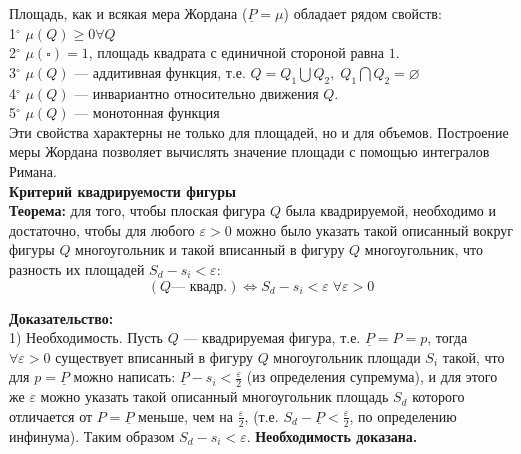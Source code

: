 \documentclass{article}
\begin{document}
  Площадь, как и всякая мера Жордана ($\underline P=\mu$) обладает рядом свойств:\\
  
  1$^\circ$ $\mu(Q)\geq 0 \forall Q$\\
  
  2$^\circ$ $\mu(\square)=1$, площадь квадрата с единичной стороной равна $1$.\\
  
  3$^\circ$ $\mu(Q)$ --- аддитивная функция, т.е. $Q=Q_1\bigcup Q_2,\; Q_1\bigcap Q_2 = \varnothing$\\
  
  4$^\circ$ $\mu(Q)$ --- инвариантно относительно движения $Q$.\\
  
  5$^\circ$ $\mu(Q)$ --- монотонная функция\\

  Эти свойства характерны не только для площадей, но и для объемов. Построение меры Жордана позволяет вычислять значение площади с помощью интегралов Римана.\\
  
  \large\textbf{Критерий квадрируемости фигуры}\normalsize\\
  
  \textbf{Теорема:} для того, чтобы плоская фигура $Q$ была квадрируемой, необходимо и достаточно, чтобы для любого $\varepsilon>0$ можно было указать такой описанный вокруг фигуры $Q$ многоугольник и такой вписанный в фигуру $Q$ многоугольник, что разность их площадей $S_d-s_i<\varepsilon$:
  \begin{equation}
    (Q \text{--- квадр.}) \Leftrightarrow S_d-s_i<\varepsilon\; \forall\varepsilon>0
  \end{equation}
  
  \textbf{Доказательство:}\\
  
  1) Необходимость. Пусть $Q$ --- квадрируемая фигура, т.е. $\underline P=P=p$, тогда $\forall\varepsilon>0$ существует вписанный в фигуру $Q$ многоугольник площади $S_i$ такой, что для $p=\underline P$ можно написать: $\underline P-s_i<\frac{\varepsilon}{2}$ (из определения супремума), и для этого же $\varepsilon$ можно указать такой описанный многоугольник площадь $S_d$ которого отличается от $P=\underline P$ меньше, чем на $\frac{\varepsilon}{2}$, (т.е. $S_d-\underline P<\frac{\varepsilon}{2}$, по определению инфинума). Таким образом $S_d-s_i<\varepsilon$. \textbf{Необходимость доказана.}\\
  
\end{document}

